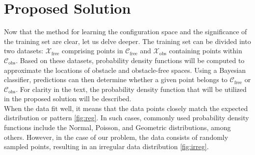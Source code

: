 \documentclass{ctuthesis}
\begin{document}
\section{Proposed Solution} 
Now that the method for learning the configuration space and the significance 
of the training set are clear, let us delve deeper. 
The training set can be divided into two datasets: 
\( \mathcal{X}_{\text{free}} \)  comprising points in \( \mathcal{C}_{\text{free}} \) and 
\( \mathcal{X}_{\text{obs}} \)  containing points within \( \mathcal{C}_{\text{obs}} \). 
Based on these datasets, 
probability density functions will be computed to 
approximate the locations of obstacle and 
obstacle-free spaces. 
Using a Bayesian classifier, 
predictions can then determine whether a given point 
belongs to \( \mathcal{C}_{\text{free}} \) or \( \mathcal{C}_{\text{obs}} \).
For clarity in the text, the probability density function that 
will be utilized in the proposed solution will be described.
\\[12pt]
When the data fit well, it means that the data points closely match 
the expected distribution or pattern \ref{fig:reg}. 
In such cases, commonly used probability density functions include the Normal, Poisson, and 
Geometric distributions, among others.
However, in the case of our problem, the data consists of randomly sampled points, 
resulting in an irregular data distribution \ref{fig:irreg}. 
\end{document}
